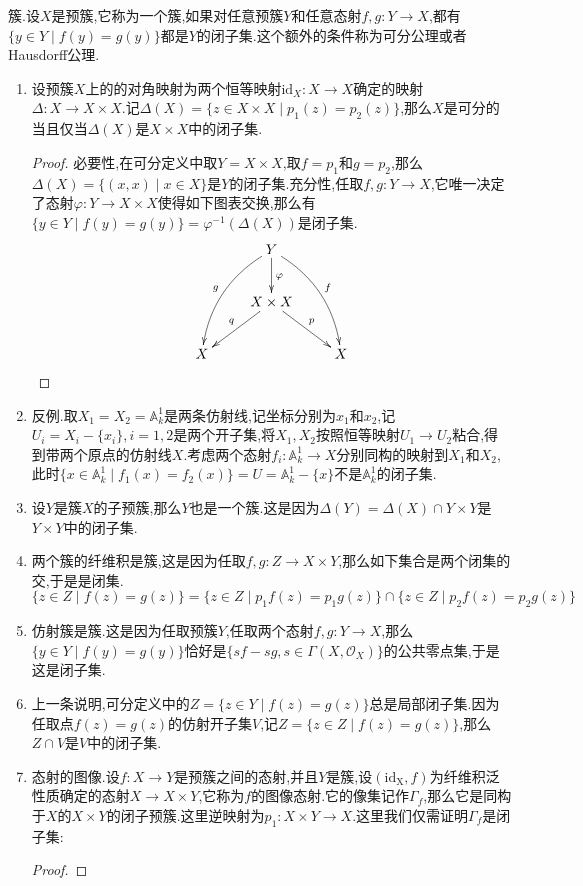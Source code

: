 簇.设$X$是预簇,它称为一个簇,如果对任意预簇$Y$和任意态射$f,g:Y\to X$,都有$\{y\in Y\mid f(y)=g(y)\}$都是$Y$的闭子集.这个额外的条件称为可分公理或者Hausdorff公理.
\begin{enumerate}
	\item 设预簇$X$上的的对角映射为两个恒等映射$\mathrm{id}_X:X\to X$确定的映射$\Delta:X\to X\times X$.记$\Delta(X)=\{z\in X\times X\mid p_1(z)=p_2(z)\}$,那么$X$是可分的当且仅当$\Delta(X)$是$X\times X$中的闭子集.
	\begin{proof}
		
		必要性,在可分定义中取$Y=X\times X$,取$f=p_1$和$g=p_2$,那么$\Delta(X)=\{(x,x)\mid x\in X\}$是$Y$的闭子集.充分性,任取$f,g:Y\to X$,它唯一决定了态射$\varphi:Y\to X\times X$使得如下图表交换,那么有$\{y\in Y\mid f(y)=g(y)\}=\varphi^{-1}(\Delta(X))$是闭子集.
		$$\xymatrix{&Y\ar@/^1pc/[ddr]^f\ar@/_1pc/[ddl]_g\ar[d]^{\varphi}&\\&X\times X\ar[dr]^{p}\ar[dl]_{q}&\\X&&X}$$
	\end{proof}
    \item 反例.取$X_1=X_2=\mathbb{A}_k^1$是两条仿射线,记坐标分别为$x_1$和$x_2$,记$U_i=X_i-\{x_i\},i=1,2$是两个开子集,将$X_1,X_2$按照恒等映射$U_1\to U_2$粘合,得到带两个原点的仿射线$X$.考虑两个态射$f_i:\mathbb{A}_k^1\to X$分别同构的映射到$X_1$和$X_2$,此时$\{x\in\mathbb{A}_k^1\mid f_1(x)=f_2(x)\}=U=\mathbb{A}^1_k-\{x\}$不是$\mathbb{A}_k^1$的闭子集.
	\item 设$Y$是簇$X$的子预簇,那么$Y$也是一个簇.这是因为$\Delta(Y)=\Delta(X)\cap Y\times Y$是$Y\times Y$中的闭子集.
	\item 两个簇的纤维积是簇,这是因为任取$f,g:Z\to X\times Y$,那么如下集合是两个闭集的交,于是是闭集.
	$$\{z\in Z\mid f(z)=g(z)\}=\{z\in Z\mid p_1f(z)=p_1g(z)\}\cap\{z\in Z\mid p_2f(z)=p_2g(z)\}$$
	\item 仿射簇是簇.这是因为任取预簇$Y$,任取两个态射$f,g:Y\to X$,那么$\{y\in Y\mid f(y)=g(y)\}$恰好是$\{sf-sg,s\in\Gamma(X,\mathscr{O}_X)\}$的公共零点集,于是这是闭子集.
	\item 上一条说明,可分定义中的$Z=\{z\in Y\mid f(z)=g(z)\}$总是局部闭子集.因为任取点$f(z)=g(z)$的仿射开子集$V$,记$Z=\{z\in Z\mid f(z)=g(z)\}$,那么$Z\cap V$是$V$中的闭子集.
	\item 态射的图像.设$f:X\to Y$是预簇之间的态射,并且$Y$是簇,设$(\mathrm{id_X},f)$为纤维积泛性质确定的态射$X\to X\times Y$,它称为$f$的图像态射.它的像集记作$\Gamma_f$,那么它是同构于$X$的$X\times Y$的闭子预簇.这里逆映射为$p_1:X\times Y\to X$.这里我们仅需证明$\Gamma_f$是闭子集:
	\begin{proof}
		

\end{proof}
\end{enumerate}
